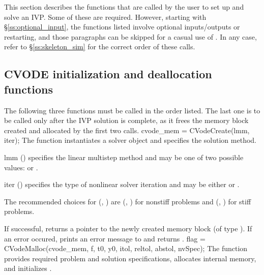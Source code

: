 This section describes the {\cvode} functions that are called by the user to set up 
and solve an IVP. Some of these are required. However, starting with \S\ref{ss:optional_input},
the functions listed involve optional inputs/outputs or restarting, and those paragraphs can 
be skipped for a casual use of {\cvode}. In any case, refer to \S\ref{ss:skeleton_sim} for
the correct order of these calls.

\subsection{CVODE initialization and deallocation functions}
\label{sss:cvodemalloc}
The following three functions must be called in the order listed. The last one is to be 
called only after the IVP solution is complete, as it frees the {\cvode} memory block
created and allocated by the first two calls.
{
  cvode\_mem = CVodeCreate(lmm, iter);
}
{
  The function  instantiates a {\cvode} solver object and specifies 
  the solution method.
}
{
  \begin{args}[iter]
  \item[lmm] ()
    specifies the linear multistep method and may be one of two
    possible values:  or .     
  \item[iter] ()
    specifies the type of nonlinear solver iteration and may be
    either  or . 
  \end{args}
  The recommended choices for (, ) are
  (, ) for nonstiff problems and
  (, ) for stiff problems.
}
{
  If successful,  returns a pointer to the newly created 
  {\cvode} memory block (of type ).
  If an error occured,  prints an error message to 
  and returns .
}
{}
{
flag = CVodeMalloc(cvode\_mem, f, t0, y0, itol, reltol, abstol, nvSpec);
}
{
  The function  provides required problem and solution specifications, 
  allocates internal memory, and initializes {\cvode}.
}

